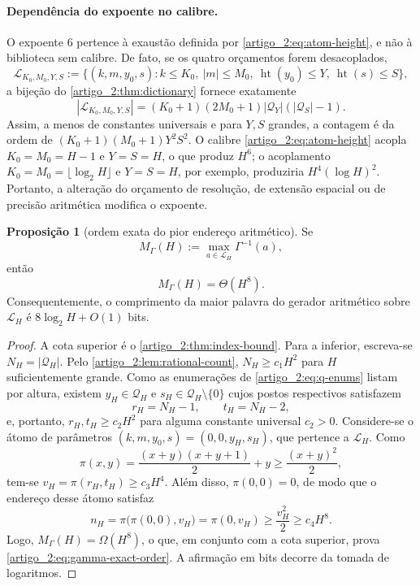 \documentclass[12pt,a4paper]{article}
\theoremstyle{preciso}
\theoremstyle{definition}
\newcommand{\Library}{\mathcal{L}}
\newcommand{\height}{\operatorname{ht}}
\theoremstyle{preciso}
\theoremstyle{preciso}
\theoremstyle{preciso}
\newtheorem{proposition}[teorema]{Proposição}
\theoremstyle{preciso}
\theoremstyle{definition}
\theoremstyle{preciso}
\theoremstyle{definition}
\theoremstyle{preciso}
\theoremstyle{preciso}
\theoremstyle{definition}
\begin{document}
\paragraph{Dependência do expoente no calibre.}
O expoente $6$ pertence à exaustão definida por \eqref{artigo_2:eq:atom-height}, e não à
biblioteca sem calibre. De fato, se os quatro orçamentos forem desacoplados,
\[
 \Library_{K_0,M_0,Y,S}
 :=\{(k,m,y_0,s):k\le K_0,\ |m|\le M_0,
       \ \height(y_0)\le Y,\ \height(s)\le S\},
\]
a bijeção do \cref{artigo_2:thm:dictionary} fornece exatamente
\[
 |\Library_{K_0,M_0,Y,S}|
 =(K_0+1)(2M_0+1)|\mathcal Q_Y|
   (|\mathcal Q_S|-1).
\]
Assim, a menos de constantes universais e para $Y,S$ grandes, a contagem é da ordem
de $(K_0+1)(M_0+1)Y^2S^2$. O calibre
\eqref{artigo_2:eq:atom-height} acopla $K_0=M_0=H-1$ e $Y=S=H$, o que produz $H^6$;
o acoplamento $K_0=M_0=\lfloor\log_2H\rfloor$ e $Y=S=H$, por exemplo,
produziria $H^4(\log H)^2$. Portanto, a alteração do orçamento de resolução, de extensão
espacial ou de precisão aritmética modifica o expoente.

\begin{proposition}[ordem exata do pior endereço aritmético]\label{map:artigo_2:3.3}
\label{artigo_2:prop:gamma-exact-order}
Se
\[
 M_\Gamma(H):=\max_{a\in\Library_H}\Gamma^{-1}(a),
\]
então
\begin{equation}
 M_\Gamma(H)=\Theta(H^8).
 \label{artigo_2:eq:gamma-exact-order}
\end{equation}
Consequentemente, o comprimento da maior palavra do gerador aritmético sobre
$\Library_H$ é $8\log_2H+O(1)$ bits.
\end{proposition}

\begin{proof}
A cota superior é o \cref{artigo_2:thm:index-bound}. Para a inferior, escreva-se
$N_H=|\mathcal Q_H|$. Pelo \cref{artigo_2:lem:rational-count}, $N_H\ge c_1H^2$ para
$H$ suficientemente grande. Como as enumerações de \eqref{artigo_2:eq:q-enums} listam
por altura, existem $y_H\in\mathcal Q_H$ e
$s_H\in\mathcal Q_H\setminus\{0\}$ cujos postos respectivos satisfazem
\[
 r_H=N_H-1,\qquad t_H=N_H-2,
\]
e, portanto, $r_H,t_H\ge c_2H^2$ para alguma constante universal $c_2>0$.
Considere-se o átomo de parâmetros $(k,m,y_0,s)=(0,0,y_H,s_H)$, que pertence a
$\Library_H$. Como
\[
 \pi(x,y)=\frac{(x+y)(x+y+1)}2+y\ge\frac{(x+y)^2}{2},
\]
tem-se $v_H=\pi(r_H,t_H)\ge c_3H^4$. Além disso,
$\pi(0,0)=0$, de modo que o endereço desse átomo satisfaz
\[
 n_H=\pi\bigl(\pi(0,0),v_H\bigr)=\pi(0,v_H)
 \ge\frac{v_H^2}{2}\ge c_4H^8.
\]
Logo, $M_\Gamma(H)=\Omega(H^8)$, o que, em conjunto com a cota superior, prova
\eqref{artigo_2:eq:gamma-exact-order}. A afirmação em bits decorre da tomada de logaritmos.
\end{proof}
\end{document}
